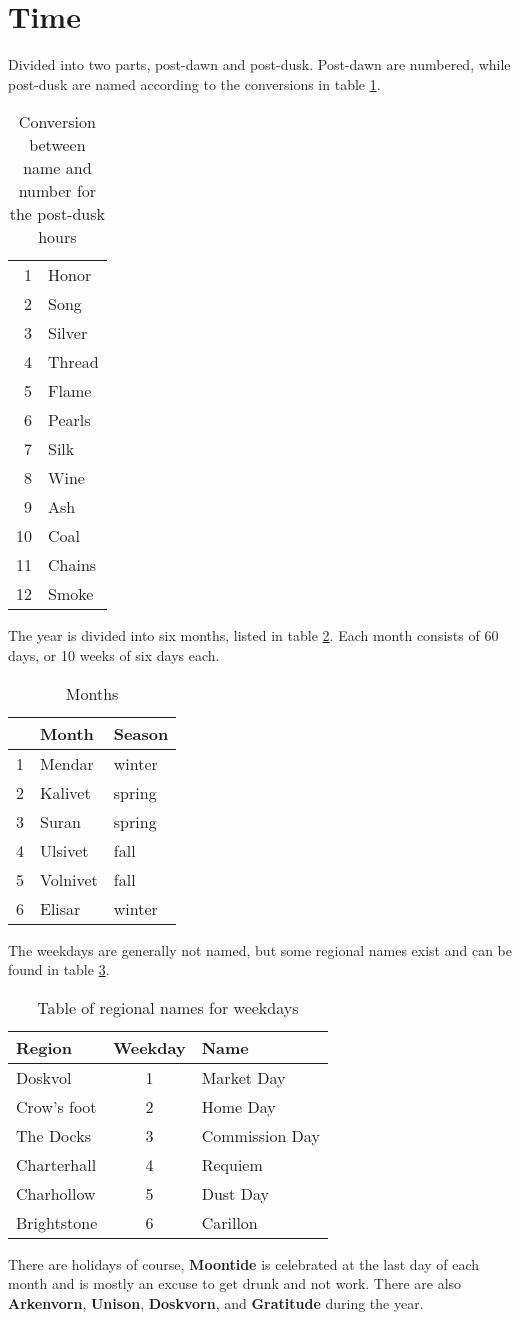 \documentclass{article}
\begin{document}
\section*{Time}
Divided into two parts, post-dawn and post-dusk.
Post-dawn are numbered, while post-dusk are named according to the conversions in table \ref{tab:dusk_hours}.
\begin{table}[H]
    \centering
    \begin{tabular}{r|l}
        1 & Honor   \\
        2 & Song    \\
        3 & Silver  \\
        4 & Thread  \\
        5 & Flame   \\
        6 & Pearls  \\
        7 & Silk    \\
        8 & Wine    \\
        9 & Ash     \\
        10 & Coal   \\
        11 & Chains \\
        12 & Smoke
    \end{tabular}
    \caption{Conversion between name and number for the post-dusk hours}
    \label{tab:dusk_hours}
\end{table}
The year is divided into six months, listed in table \ref{tab:months}.
Each month consists of 60 days, or 10 weeks of six days each.
\begin{table}[H]
    \centering
    \begin{tabular}{r|l|l}
          & \textbf{Month} & \textbf{Season} \\
        \hline
        1 & Mendar & winter \\
        2 & Kalivet & spring \\
        3 & Suran  & spring \\
        4 & Ulsivet & fall \\
        5 & Volnivet &fall \\
        6 & Elisar & winter
    \end{tabular}
    \caption{Months}
    \label{tab:months}
\end{table}
The weekdays are generally not named, but some regional names exist and can be found in table \ref{tab:weekdays}.
\begin{table}[H]
    \centering
    \begin{tabular}{l|c|l}
        \textbf{Region} & \textbf{Weekday} & \textbf{Name} \\
        \hline
        Doskvol     & 1 & Market Day \\
        Crow's foot & 2 & Home Day \\
        The Docks   & 3 & Commission Day \\
        Charterhall & 4 & Requiem \\
        Charhollow  & 5 & Dust Day \\
        Brightstone & 6 & Carillon
    \end{tabular}
    \caption{Table of regional names for weekdays}
    \label{tab:weekdays}
\end{table}
There are holidays of course, \textbf{Moontide} is celebrated at the last day of each month and is mostly an excuse to get drunk and not work.
There are also \textbf{Arkenvorn}, \textbf{Unison}, \textbf{Doskvorn}, and \textbf{Gratitude} during the year.
\end{document}
